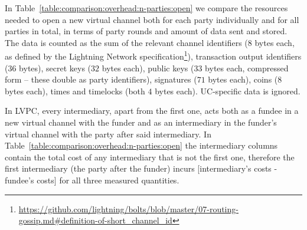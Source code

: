   In Table~\ref{table:comparison:overhead:n-parties:open} we compare the
  resources needed to open a new virtual channel both for each party
  individually and for all parties in total, in terms of party rounds and amount
  of data sent and stored. The data is counted as the sum of the relevant
  channel identifiers ($8$ bytes each, as defined by the Lightning Network
  specification\footnote{\url{https://github.com/lightning/bolts/blob/master/07-routing-gossip.md\#definition-of-short_channel_id}}),
  transaction output identifiers ($36$ bytes), secret keys ($32$ bytes each),
  public keys ($33$ bytes each, compressed form -- these double as party
  identifiers), signatures ($71$ bytes each), coins ($8$ bytes each), times and
  timelocks (both $4$ bytes each). UC-specific data is ignored.

  In LVPC, every intermediary, apart from the first one, acts both as a fundee
  in a new virtual channel with the funder and as an intermediary in the
  funder's virtual channel with the party after said intermediary. In
  Table~\ref{table:comparison:overhead:n-parties:open} the intermediary columns
  contain the total cost of any intermediary that is not the first one,
  therefore the first intermediary (the party after the funder) incurs
  [intermediary's costs - fundee's costs] for all three measured quantities.

